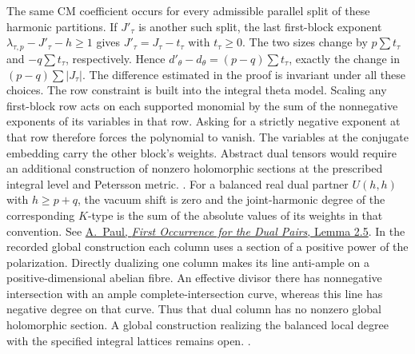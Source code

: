 The same CM coefficient occurs for every admissible parallel split
of these harmonic partitions. If \(J'_\tau\) is another such split,
the last first-block exponent
\(\lambda_{\tau,p}-J'_\tau-h\ge1\) gives
\(J'_\tau=J_\tau-t_\tau\) with \(t_\tau\ge0\). The two sizes change
by \(p\sum t_\tau\) and \(-q\sum t_\tau\), respectively.
Hence \(d'_\theta-d_\theta=(p-q)\sum t_\tau\), exactly the change
in \((p-q)\sum|J_\tau|\). The difference estimated in the proof is
invariant under all these choices.
The row constraint is built into the integral theta model.
Scaling any first-block row acts on each supported monomial by the
sum of the nonnegative exponents of its variables in that row.
Asking for a strictly negative exponent at that row therefore
forces the polynomial to vanish. The variables at the conjugate
embedding carry the other block's weights. Abstract dual tensors
would require an additional construction of nonzero holomorphic
sections at the prescribed integral level and Petersson metric.
.
For a balanced real dual partner \(U(h,h)\) with \(h\ge p+q\),
the vacuum shift is zero and the joint-harmonic degree of the
corresponding \(K\)-type is the sum of the absolute values of its
weights in that convention. See
\href{https://www.cambridge.org/core/journals/canadian-journal-of-mathematics/article/first-occurrence-for-the-dual-pairs-up-q-ur-s/067CC33C0E6A7CA220B464E50B7A65AA}
{A.~Paul, \emph{First Occurrence for the Dual Pairs}, Lemma 2.5}.
In the recorded global construction each column uses a section of a
positive power of the polarization. Directly dualizing one column
makes its line anti-ample on a positive-dimensional abelian fibre.
An effective divisor there has nonnegative intersection with an
ample complete-intersection curve, whereas this line has negative
degree on that curve. Thus that dual column has no nonzero global
holomorphic section. A global construction realizing the balanced
local degree with the specified integral lattices remains open.
.

